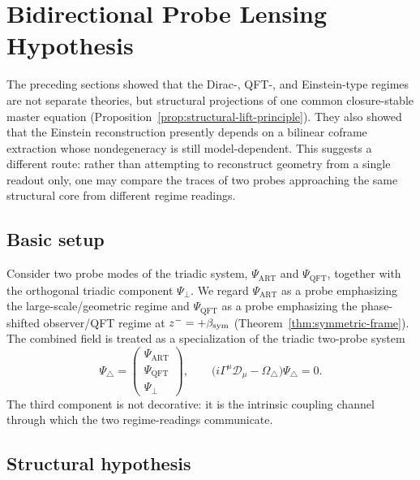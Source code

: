 \section{Bidirectional Probe Lensing Hypothesis}
\label{sec:bidirectional-probe-lensing}

The preceding sections showed that the Dirac-, QFT-, and Einstein-type
regimes are not separate theories, but structural projections of one
common closure-stable master equation
(Proposition~\ref{prop:structural-lift-principle}). They also showed
that the Einstein reconstruction presently depends on a bilinear coframe
extraction whose nondegeneracy is still model-dependent. This suggests a
different route: rather than attempting to reconstruct geometry from a
single readout only, one may compare the traces of two probes approaching
the same structural core from different regime readings.

\subsection*{Basic setup}

Consider two probe modes of the triadic system,
$\Psi_{\mathrm{ART}}$ and $\Psi_{\mathrm{QFT}}$,
together with the orthogonal triadic component $\Psi_\perp$.
We regard $\Psi_{\mathrm{ART}}$ as a probe emphasizing the
large-scale/geometric regime and $\Psi_{\mathrm{QFT}}$ as a probe
emphasizing the phase-shifted observer/QFT regime at
$z^- = +\beta_{\mathrm{sym}}$ (Theorem~\ref{thm:symmetric-frame}).
The combined field is treated as a specialization of the triadic
two-probe system
\[
 \Psi_{\triangle}
 =
 \begin{pmatrix}
 \Psi_{\mathrm{ART}}\\
 \Psi_{\mathrm{QFT}}\\
 \Psi_\perp
 \end{pmatrix},
 \qquad
 \bigl(i\Gamma^\mu\mathcal{D}_\mu - \Omega_\triangle\bigr)
 \Psi_\triangle = 0.
\]
The third component is not decorative: it is the intrinsic coupling
channel through which the two regime-readings communicate.

\subsection*{Structural hypothesis}

